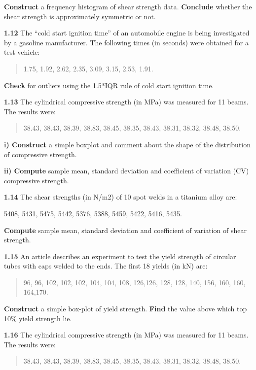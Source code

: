 \documentclass[
  11pt,
  letterpaper,
  DIV=11,
  numbers=noendperiod]{scrreprt}
\begin{document}
\textbf{Construct} a frequency histogram of shear strength data.
\textbf{Conclude} whether the shear strength is approximately symmetric
or not.

\textbf{1.12} The ``cold start ignition time'' of an automobile engine
is being investigated by a gasoline manufacturer. The following times
(in seconds) were obtained for a test vehicle:

\begin{quote}
1.75, 1.92, 2.62, 2.35, 3.09, 3.15, 2.53, 1.91.
\end{quote}

\textbf{Check} for outliers using the 1.5*IQR rule of cold start
ignition time.

\textbf{1.13} The cylindrical compressive strength (in MPa) was measured
for 11 beams. The results were:

\begin{quote}
38.43, 38.43, 38.39, 38.83, 38.45, 38.35, 38.43, 38.31, 38.32, 38.48,
38.50.
\end{quote}

\textbf{i) Construct} a simple boxplot and comment about the shape of
the distribution of compressive strength.

\textbf{ii) Compute} sample mean, standard deviation and coefficient of
variation (CV) compressive strength.

\textbf{1.14} The shear strengths (in N/m2) of 10 spot welds in a
titanium alloy are:

5408, 5431, 5475, 5442, 5376, 5388, 5459, 5422, 5416, 5435.

\textbf{Compute} sample mean, standard deviation and coefficient of
variation of shear strength.

\textbf{1.15} An article describes an experiment to test the yield
strength of circular tubes with caps welded to the ends. The first 18
yields (in kN) are:

\begin{quote}
96, 96, 102, 102, 102, 104, 104, 108, 126,126, 128, 128, 140, 156, 160,
160, 164,170.
\end{quote}

\textbf{Construct} a simple box-plot of yield strength. \textbf{Find}
the value above which top 10\% yield strength lie.

\textbf{1.16} The cylindrical compressive strength (in MPa) was measured
for 11 beams. The results were:

\begin{quote}
38.43, 38.43, 38.39, 38.83, 38.45, 38.35, 38.43, 38.31, 38.32, 38.48,
38.50.
\end{quote}
\end{document}

